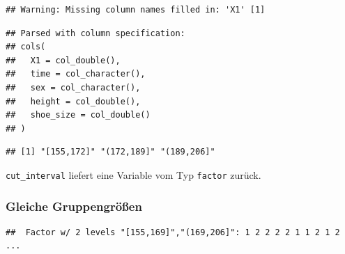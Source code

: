 \documentclass[12pt,ngerman,paper=a4,pagesize,DIV=13]{scrreprt}
\newenvironment{Shaded}{\begin{snugshade}}{\end{snugshade}}
\newcommand{\DataTypeTok}[1]{\textcolor[rgb]{0.13,0.29,0.53}{#1}}
\newcommand{\DecValTok}[1]{\textcolor[rgb]{0.00,0.00,0.81}{#1}}
\newcommand{\KeywordTok}[1]{\textcolor[rgb]{0.13,0.29,0.53}{\textbf{#1}}}
\newcommand{\NormalTok}[1]{#1}
\newcommand{\OperatorTok}[1]{\textcolor[rgb]{0.81,0.36,0.00}{\textbf{#1}}}
\newcommand{\StringTok}[1]{\textcolor[rgb]{0.31,0.60,0.02}{#1}}
\begin{document}
\begin{verbatim}
## Warning: Missing column names filled in: 'X1' [1]
\end{verbatim}

\begin{verbatim}
## Parsed with column specification:
## cols(
##   X1 = col_double(),
##   time = col_character(),
##   sex = col_character(),
##   height = col_double(),
##   shoe_size = col_double()
## )
\end{verbatim}

\begin{Shaded}
\end{Shaded}

\begin{verbatim}
## [1] "[155,172]" "(172,189]" "(189,206]"
\end{verbatim}

\texttt{cut\_interval} liefert eine Variable vom Typ \texttt{factor}
zurück.

\hypertarget{gleiche-gruppengroen}{%
\subsubsection{Gleiche Gruppengrößen}\label{gleiche-gruppengroen}}

\begin{Shaded}
\end{Shaded}

\begin{verbatim}
##  Factor w/ 2 levels "[155,169]","(169,206]": 1 2 2 2 2 1 1 2 1 2 ...
\end{verbatim}
\end{document}
